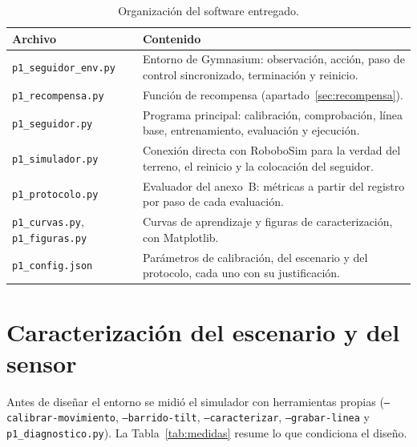 \documentclass[11pt,a4paper]{article}
\newcommand{\cod}[1]{\texttt{\small #1}}
\begin{document}
\begin{table}[h]
\centering\small
\caption{Organización del software entregado.}
\label{tab:software}
\begin{tabularx}{\linewidth}{@{}lY@{}}
\toprule
Archivo & Contenido \\
\midrule
\cod{p1\_seguidor\_env.py} & Entorno de Gymnasium: observación, acción, paso de control sincronizado, terminación y reinicio. \\
\cod{p1\_recompensa.py} & Función de recompensa (apartado~\ref{sec:recompensa}). \\
\cod{p1\_seguidor.py} & Programa principal: calibración, comprobación, línea base, entrenamiento, evaluación y ejecución. \\
\cod{p1\_simulador.py} & Conexión directa con RoboboSim para la verdad del terreno, el reinicio y la colocación del seguidor. \\
\cod{p1\_protocolo.py} & Evaluador del anexo~B: métricas a partir del registro por paso de cada evaluación. \\
\cod{p1\_curvas.py}, \cod{p1\_figuras.py} & Curvas de aprendizaje y figuras de caracterización, con Matplotlib. \\
\cod{p1\_config.json} & Parámetros de calibración, del escenario y del protocolo, cada uno con su justificación. \\
\bottomrule
\end{tabularx}
\end{table}

\section{Caracterización del escenario y del sensor}

Antes de diseñar el entorno se midió el simulador con herramientas propias (\cod{--calibrar-movimiento},
\cod{--barrido-tilt}, \cod{--caracterizar}, \cod{--grabar-linea} y \cod{p1\_diagnostico.py}). La
Tabla~\ref{tab:medidas} resume lo que condiciona el diseño.
\end{document}
